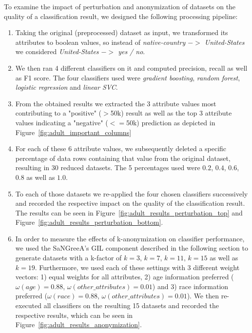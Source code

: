 \documentclass{llncs}
\begin{document}
To examine the impact of perturbation and anonymization of datasets on the quality of a classification result, we designed the following processing pipeline:


\begin{enumerate}
	\item Taking the original (preprocessed) dataset as input, we transformed its attributes to boolean values, so instead of \textit{native-country $->$ United-States} we considered \textit{United-States $->$ yes / no}.
	\item We then ran 4 different classifiers on it and computed precision, recall as well as F1 score. The four classifiers used were \textit{gradient boosting}, \textit{random forest}, \textit{logistic regression} and \textit{linear SVC}.
	\item From the obtained results we extracted the 3 attribute values most contributing to a "positive" ($>$50k) result as well as the top 3 attribute values indicating a "negative" ($<=$50k) prediction as depicted in Figure~\ref{fig:adult_important_columns}
	\item For each of these 6 attribute values, we subsequently deleted a specific percentage of data rows containing that value from the original dataset, resulting in 30 reduced datasets. The 5 percentages used were $0.2$, $0.4$, $0.6$, $0.8$ as well as $1.0$.
	\item To each of those datasets we re-applied the four chosen classifiers successively and recorded the respective impact on the quality of the classification result. The results can be seen in Figure~\ref{fig:adult_results_perturbation_top} and Figure~\ref{fig:adult_results_perturbation_bottom}.
	\item In order to measure the effects of k-anonymization on classifier performance, we used the SaNGreeA's GIL component described in the following section to generate datasets with a k-factor of $k=3$, $k=7$, $k=11$, $k=15$ as well as $k=19$. Furthermore, we used each of these settings with 3 different weight vectors: 1) equal weights for all attributes, 2) age information preferred ($\omega(age)=0.88$, $\omega(other\_attributes)=0.01$) and 3) race information preferred ($\omega(race)=0.88$, $\omega(other\_attributes)=0.01$). We then re-executed all classifiers on the resulting 15 datasets and recorded the respective results, which can be seen in Figure~\ref{fig:adult_results_anonymization}.
\end{enumerate}
\end{document}
